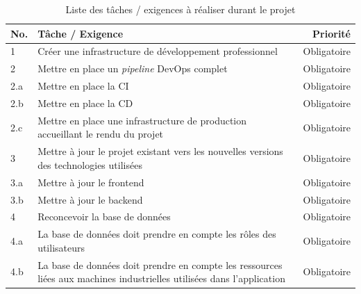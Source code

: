 \documentclass[
    iai, %
    il, %
]{heig-tb}
\begin{document}
\begin{table}[h]
    \begin{center}
        \caption{Liste des tâches / exigences à réaliser durant le projet \label{taches}}
        \begin{tabularx}{1.0\textwidth} {l|X|r}
            No. & Tâche / Exigence                                                                                                       & Priorité      \\ \hline
            1   & Créer une infrastructure de développement professionnel                                                                & Obligatoire   \\
            2   & Mettre en place un \emph{pipeline} DevOps complet                                                                      & Obligatoire   \\
            2.a & Mettre en place la CI                                                                                                  & Obligatoire   \\
            2.b & Mettre en place la CD                                                                                                  & Obligatoire   \\
            2.c & Mettre en place une infrastructure de production accueillant le rendu du projet                                        & Obligatoire   \\
            3   & Mettre à jour le projet existant vers les nouvelles versions des technologies utilisées                                & Obligatoire   \\
            3.a & Mettre à jour le frontend                                                                                              & Obligatoire   \\
            3.b & Mettre à jour le backend                                                                                               & Obligatoire   \\
            4   & Reconcevoir la base de données                                                                                         & Obligatoire   \\
            4.a & La base de données doit prendre en compte les rôles des utilisateurs                                                   & Obligatoire   \\
            4.b & La base de données doit prendre en compte les ressources liées aux machines industrielles utilisées dans l'application & Obligatoire   \\

\end{tabularx}
\end{center}
\end{table}
\end{document}
